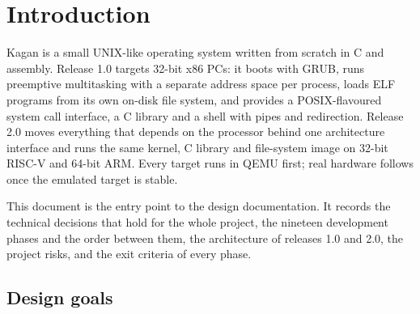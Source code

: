 \documentclass[11pt,a4paper]{article}
\begin{document}
\thispagestyle{plain}

\noindent{}

\vspace{0.6em}
\tableofcontents

\section{Introduction}

Kagan is a small UNIX-like operating system written from scratch in C and assembly. Release 1.0 targets 32-bit
x86 PCs: it boots with GRUB, runs preemptive multitasking with a separate address space per process, loads ELF
programs from its own on-disk file system, and provides a POSIX-flavoured system call interface, a C library and a
shell with pipes and redirection. Release 2.0 moves everything that depends on the processor behind one architecture
interface and runs the same kernel, C library and file-system image on 32-bit RISC-V and 64-bit ARM. Every target
runs in QEMU first; real hardware follows once the emulated target is stable.

This document is the entry point to the design documentation. It records the technical decisions that hold for the
whole project, the nineteen development phases and the order between them, the architecture of releases 1.0 and
2.0, the project risks, and the exit criteria of every phase.

\subsection{Design goals}
\end{document}
